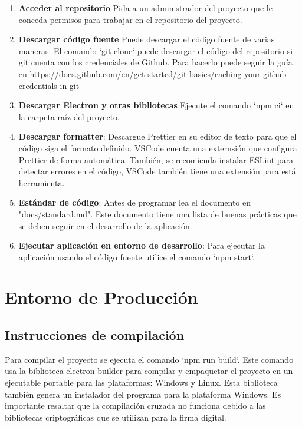 \begin{enumerate}
	\item \textbf{Acceder al repositorio} Pida a un administrador del proyecto que le conceda permisos para trabajar en el repositorio del proyecto. 
	
	\item \textbf{Descargar código fuente} Puede descargar el código fuente de varias maneras. El comando `git clone` puede descargar el código del repositorio si git cuenta con los credenciales de Github. Para hacerlo puede seguir la guía en \url{https://docs.github.com/en/get-started/git-basics/caching-your-github-credentials-in-git}
	
	\item \textbf{Descargar Electron y otras bibliotecas} Ejecute el comando `npm ci` en la carpeta raíz del proyecto.
	
	\item \textbf{Descargar formatter}: Descargue Prettier en su editor de texto para que el código siga el formato definido. VSCode cuenta una externsión que configura Prettier de forma automática. También, se recomienda instalar ESLint para detectar errores en el código, VSCode también tiene una extensión para está herramienta.
	
	\item \textbf{Estándar de código}: Antes de programar lea el documento en "docs/standard.md". Este documento tiene una lista de buenas prácticas que se deben seguir en el desarrollo de la aplicación.
	
	\item \textbf{Ejecutar aplicación en entorno de desarrollo}: Para ejecutar la aplicación usando el código fuente utilice el comando `npm start`.
	
\end{enumerate}

\section{Entorno de Producción}

\subsection{Instrucciones de compilación}
Para compilar el proyecto se ejecuta el comando `npm run build`. Este comando usa la biblioteca electron-builder para compilar y empaquetar el proyecto en un ejecutable portable para las plataformas: Windows y Linux. Esta biblioteca también genera un instalador del programa para la plataforma Windows. Es importante resaltar que la compilación cruzada no funciona debido a las bibliotecas criptográficas que se utilizan para la firma digital.

